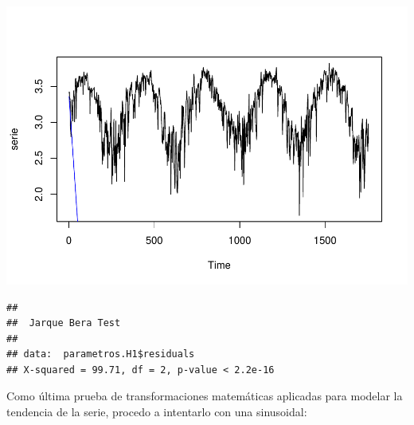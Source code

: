 \documentclass[]{article}
\newenvironment{Shaded}{\begin{snugshade}}{\end{snugshade}}
\newcommand{\KeywordTok}[1]{\textcolor[rgb]{0.13,0.29,0.53}{\textbf{#1}}}
\newcommand{\StringTok}[1]{\textcolor[rgb]{0.31,0.60,0.02}{#1}}
\newcommand{\CommentTok}[1]{\textcolor[rgb]{0.56,0.35,0.01}{\textit{#1}}}
\newcommand{\OperatorTok}[1]{\textcolor[rgb]{0.81,0.36,0.00}{\textbf{#1}}}
\newcommand{\NormalTok}[1]{#1}
\begin{document}
\includegraphics{timeSeries_files/figure-latex/unnamed-chunk-52-1.pdf}

\begin{Shaded}
\end{Shaded}

\begin{verbatim}
## 
##  Jarque Bera Test
## 
## data:  parametros.H1$residuals
## X-squared = 99.71, df = 2, p-value < 2.2e-16
\end{verbatim}

Como última prueba de transformaciones matemáticas aplicadas para
modelar la tendencia de la serie, procedo a intentarlo con una
sinusoidal:
\end{document}
